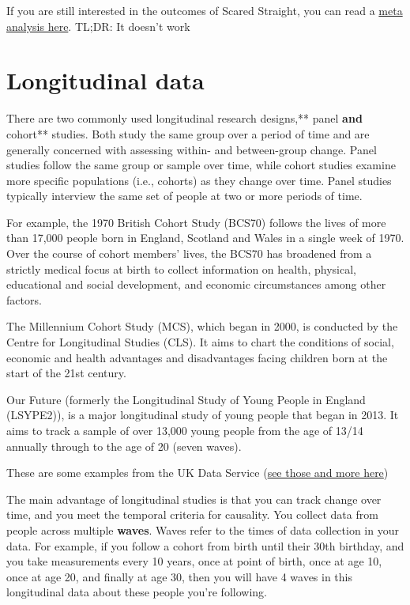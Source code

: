 \documentclass[]{book}
\theoremstyle{definition}
\theoremstyle{definition}
\theoremstyle{definition}
\theoremstyle{remark}
\begin{document}
If you are still interested in the outcomes of Scared Straight, you can
read a
\href{http://onlinelibrary.wiley.com/doi/10.1002/14651858.CD002796.pub2/full}{meta
analysis here}. TL;DR: It doesn't work

\hypertarget{longitudinal-data}{%
\section{Longitudinal data}\label{longitudinal-data}}

There are two commonly used longitudinal research designs,** panel
\textbf{and }cohort** studies. Both study the same group over a period
of time and are generally concerned with assessing within- and
between-group change. Panel studies follow the same group or sample over
time, while cohort studies examine more specific populations (i.e.,
cohorts) as they change over time. Panel studies typically interview the
same set of people at two or more periods of time.

For example, the 1970 British Cohort Study (BCS70) follows the lives of
more than 17,000 people born in England, Scotland and Wales in a single
week of 1970. Over the course of cohort members' lives, the BCS70 has
broadened from a strictly medical focus at birth to collect information
on health, physical, educational and social development, and economic
circumstances among other factors.

The Millennium Cohort Study (MCS), which began in 2000, is conducted by
the Centre for Longitudinal Studies (CLS). It aims to chart the
conditions of social, economic and health advantages and disadvantages
facing children born at the start of the 21st century.

Our Future (formerly the Longitudinal Study of Young People in England
(LSYPE2)), is a major longitudinal study of young people that began in
2013. It aims to track a sample of over 13,000 young people from the age
of 13/14 annually through to the age of 20 (seven waves).

These are some examples from the UK Data Service
(\href{https://www.ukdataservice.ac.uk/get-data/key-data/cohort-and-longitudinal-studies}{see
those and more here})

The main advantage of longitudinal studies is that you can track change
over time, and you meet the temporal criteria for causality. You collect
data from people across multiple \textbf{waves}. Waves refer to the
times of data collection in your data. For example, if you follow a
cohort from birth until their 30th birthday, and you take measurements
every 10 years, once at point of birth, once at age 10, once at age 20,
and finally at age 30, then you will have 4 waves in this longitudinal
data about these people you're following.
\end{document}
